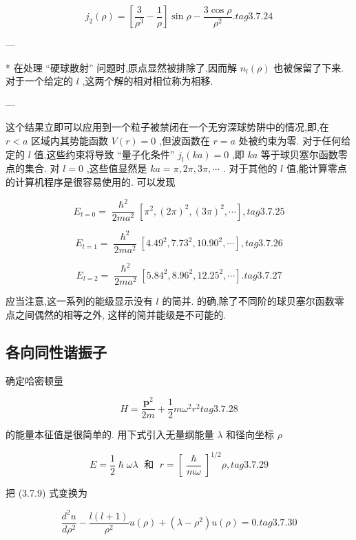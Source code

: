 $$
{j}_{2}\left( \rho \right) = \left\lbrack {\frac{3}{{\rho }^{3}} - \frac{1}{\rho }}\right\rbrack \sin \rho - \frac{3\cos \rho }{{\rho }^{2}}. tag{3. 7.24}
$$

---

* 在处理 “硬球散射” 问题时,原点显然被排除了,因而解 ${n}_{l}\left( \rho \right)$ 也被保留了下来. 对于一个给定的 $l$ ,这两个解的相对相位称为相移.

---

这个结果立即可以应用到一个粒子被禁闭在一个无穷深球势阱中的情况,即,在 $r < a$ 区域内其势能函数 $V\left( r\right) = 0$ ,但波函数在 $r = a$ 处被约束为零. 对于任何给定的 $l$ 值,这些约束将导致 “量子化条件” ${j}_{l}\left( {ka}\right) = 0$ ,即 ${ka}$ 等于球贝塞尔函数零点的集合. 对 $l = 0$ ,这些值显然是 ${ka} = \pi ,{2\pi },{3\pi },\cdots$ . 对于其他的 $l$ 值,能计算零点的计算机程序是很容易使用的. 可以发现

$$
{E}_{t = 0} = \frac{{\hslash }^{2}}{{2m}{a}^{2}}\left\lbrack {{\pi }^{2},{\left( 2\pi \right) }^{2},{\left( 3\pi \right) }^{2},\cdots }\right\rbrack , tag{3. 7.25}
$$

$$
{E}_{t = 1} = \frac{{\hslash }^{2}}{{2m}{a}^{2}}\left\lbrack {{4.49}^{2},{7.73}^{2},{10.90}^{2},\cdots }\right\rbrack , tag{3. 7.26}
$$

$$
{E}_{l = 2} = \frac{{\hslash }^{2}}{{2m}{a}^{2}}\left\lbrack {{5.84}^{2},{8.96}^{2},{12.25}^{2},\cdots }\right\rbrack . tag{3. 7.27}
$$

应当注意,这一系列的能级显示没有 $l$ 的简并. 的确,除了不同阶的球贝塞尔函数零点之间偶然的相等之外, 这样的简并能级是不可能的.

\subsection{各向同性谐振子}

确定哈密顿量

$$
H = \frac{{\mathbf{p}}^{2}}{2m} + \frac{1}{2}m{\omega }^{2}{r}^{2} tag{3. 7.28}
$$

的能量本征值是很简单的. 用下式引入无量纲能量 $\lambda$ 和径向坐标 $\rho$

$$
E = \frac{1}{2}\hslash {\omega \lambda }\;\text{ 和 }\;r = {\left\lbrack \frac{\hslash }{m\omega }\right\rbrack }^{1/2}\rho , tag{3. 7.29}
$$

把 (3.7.9) 式变换为

$$
\frac{{d}^{2}u}{d{\rho }^{2}} - \frac{l\left( {l + 1}\right) }{{\rho }^{2}}u\left( \rho \right) + \left( {\lambda - {\rho }^{2}}\right) u\left( \rho \right) = 0. tag{3. 7.30}
$$

